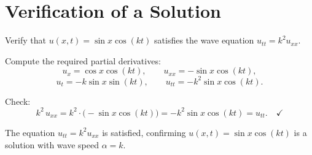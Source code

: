 \section{Verification of a Solution}

\begin{example}
Verify that $u(x,t) = \sin x\cos(kt)$ satisfies the wave equation $u_{tt} = k^2 u_{xx}$.

\begin{solution}
Compute the required partial derivatives:
\[
  u_x = \cos x\cos(kt), \qquad u_{xx} = -\sin x\cos(kt),
\]
\[
  u_t = -k\sin x\sin(kt), \qquad u_{tt} = -k^2\sin x\cos(kt).
\]

Check:
\[
  k^2\, u_{xx} = k^2\cdot\bigl(-\sin x\cos(kt)\bigr) = -k^2\sin x\cos(kt) = u_{tt}. \quad \checkmark
\]

The equation $u_{tt} = k^2 u_{xx}$ is satisfied, confirming $u(x,t) = \sin x\cos(kt)$ is a solution with wave speed $\alpha = k$.
\end{solution}
\end{example}
